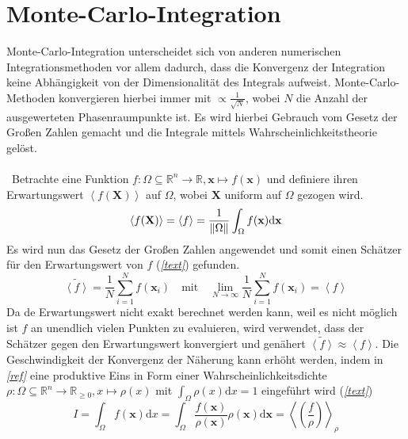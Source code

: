 \section{Monte-Carlo-Integration}
Monte-Carlo-Integration unterscheidet sich von anderen numerischen Integrationsmethoden vor allem dadurch, dass die Konvergenz der Integration keine Abhängigkeit von der Dimensionalität des Integrals aufweist. Monte-Carlo-Methoden konvergieren hierbei immer mit $\propto \frac{1}{\sqrt{N}} $, wobei $N$ die Anzahl der ausgewerteten Phasenraumpunkte ist. Es wird hierbei Gebrauch vom Gesetz der Großen Zahlen gemacht und die Integrale mittels Wahrscheinlichkeitstheorie gelöst. \\
\\\
Betrachte eine Funktion $f: \Omega \subseteq \mathbb{R}^n \rightarrow \mathbb{R}, \mathbf{x} \mapsto f(\mathbf{x})$ und definiere ihren Erwartungswert $\left\langle f(\mathbf{X})\right\rangle $ auf $\Omega$, wobei $\mathbf{X}$ uniform auf $\Omega$ gezogen wird.
\begin{equation}
\left\langle f(\mathbf{X})\right\rangle  = \left\langle f\right\rangle  = \frac{1}{\norm{\Omega}}\int_{\Omega} f(\mathbf{x}) \text{d}\mathbf{x} 
\end{equation}
Es wird nun das Gesetz der Großen Zahlen angewendet und somit einen Schätzer für den Erwartungswert von $f$ (\textit{\autoref{text}}) gefunden.
\begin{equation}
\tilde{\left\langle f \right\rangle } = \frac{1}{N} \sum_{i=1}^{N} f(\mathbf{x}_i) \quad \text{mit} \quad \lim_{N\rightarrow \infty} \frac{1}{N} \sum_{i=1}^{N} f(\mathbf{x}_i) = \left\langle f \right\rangle
\end{equation}
Da de Erwartungswert nicht exakt berechnet werden kann, weil es nicht möglich ist $f$ an unendlich vielen Punkten zu evaluieren, wird verwendet, dass der Schätzer gegen den Erwartungswert konvergiert und genähert $\tilde{\left\langle f \right\rangle } \approx \left\langle f \right\rangle$. Die Geschwindigkeit der Konvergenz der Näherung kann erhöht werden, indem in \textit{\autoref{ref}} eine produktive Eins in Form einer Wahrscheinlichkeitsdichte $\rho: \Omega \subseteq \mathbb{R}^n \to \mathbb{R}_{\geq 0}, x \mapsto \rho(x)$ mit $\int_{\Omega} \rho(x) \text{d}x = 1$ eingeführt wird (\textit{\autoref{text}})
\begin{equation}
I = \int_{\Omega} f(\mathbf{x}) \text{d}x =  \int_{\Omega} \frac{f(\mathbf{x})}{\rho(\mathbf{x})}\rho(\mathbf{x}) \text{d}\mathbf{x} = \left\langle \left(\frac{f}{\rho}\right) \right\rangle_{\rho} 
\end{equation}
